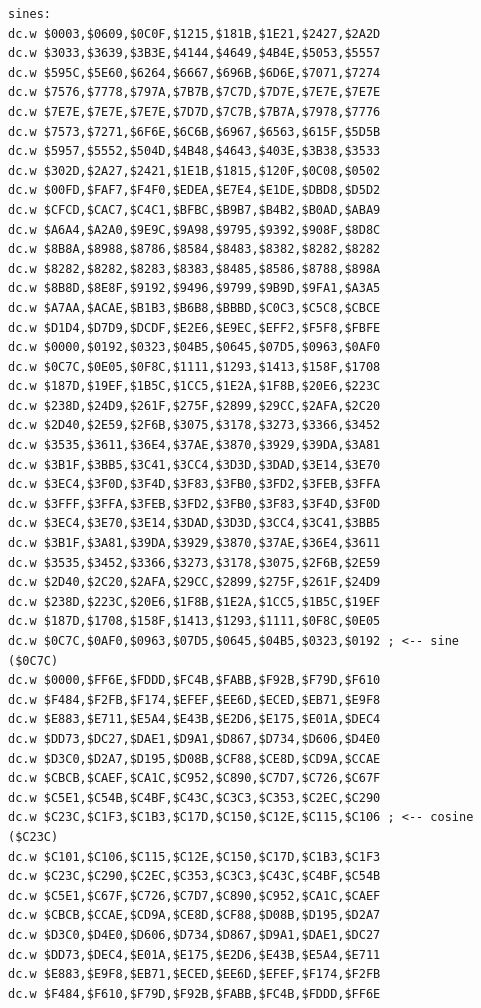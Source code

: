 \begin{lstlisting}
sines:
dc.w $0003,$0609,$0C0F,$1215,$181B,$1E21,$2427,$2A2D
dc.w $3033,$3639,$3B3E,$4144,$4649,$4B4E,$5053,$5557
dc.w $595C,$5E60,$6264,$6667,$696B,$6D6E,$7071,$7274
dc.w $7576,$7778,$797A,$7B7B,$7C7D,$7D7E,$7E7E,$7E7E
dc.w $7E7E,$7E7E,$7E7E,$7D7D,$7C7B,$7B7A,$7978,$7776
dc.w $7573,$7271,$6F6E,$6C6B,$6967,$6563,$615F,$5D5B
dc.w $5957,$5552,$504D,$4B48,$4643,$403E,$3B38,$3533
dc.w $302D,$2A27,$2421,$1E1B,$1815,$120F,$0C08,$0502
dc.w $00FD,$FAF7,$F4F0,$EDEA,$E7E4,$E1DE,$DBD8,$D5D2
dc.w $CFCD,$CAC7,$C4C1,$BFBC,$B9B7,$B4B2,$B0AD,$ABA9
dc.w $A6A4,$A2A0,$9E9C,$9A98,$9795,$9392,$908F,$8D8C
dc.w $8B8A,$8988,$8786,$8584,$8483,$8382,$8282,$8282
dc.w $8282,$8282,$8283,$8383,$8485,$8586,$8788,$898A
dc.w $8B8D,$8E8F,$9192,$9496,$9799,$9B9D,$9FA1,$A3A5
dc.w $A7AA,$ACAE,$B1B3,$B6B8,$BBBD,$C0C3,$C5C8,$CBCE
dc.w $D1D4,$D7D9,$DCDF,$E2E6,$E9EC,$EFF2,$F5F8,$FBFE
dc.w $0000,$0192,$0323,$04B5,$0645,$07D5,$0963,$0AF0 
dc.w $0C7C,$0E05,$0F8C,$1111,$1293,$1413,$158F,$1708
dc.w $187D,$19EF,$1B5C,$1CC5,$1E2A,$1F8B,$20E6,$223C
dc.w $238D,$24D9,$261F,$275F,$2899,$29CC,$2AFA,$2C20
dc.w $2D40,$2E59,$2F6B,$3075,$3178,$3273,$3366,$3452
dc.w $3535,$3611,$36E4,$37AE,$3870,$3929,$39DA,$3A81
dc.w $3B1F,$3BB5,$3C41,$3CC4,$3D3D,$3DAD,$3E14,$3E70
dc.w $3EC4,$3F0D,$3F4D,$3F83,$3FB0,$3FD2,$3FEB,$3FFA
dc.w $3FFF,$3FFA,$3FEB,$3FD2,$3FB0,$3F83,$3F4D,$3F0D 
dc.w $3EC4,$3E70,$3E14,$3DAD,$3D3D,$3CC4,$3C41,$3BB5
dc.w $3B1F,$3A81,$39DA,$3929,$3870,$37AE,$36E4,$3611
dc.w $3535,$3452,$3366,$3273,$3178,$3075,$2F6B,$2E59
dc.w $2D40,$2C20,$2AFA,$29CC,$2899,$275F,$261F,$24D9
dc.w $238D,$223C,$20E6,$1F8B,$1E2A,$1CC5,$1B5C,$19EF
dc.w $187D,$1708,$158F,$1413,$1293,$1111,$0F8C,$0E05
dc.w $0C7C,$0AF0,$0963,$07D5,$0645,$04B5,$0323,$0192 ; <-- sine ($0C7C)
dc.w $0000,$FF6E,$FDDD,$FC4B,$FABB,$F92B,$F79D,$F610 
dc.w $F484,$F2FB,$F174,$EFEF,$EE6D,$ECED,$EB71,$E9F8
dc.w $E883,$E711,$E5A4,$E43B,$E2D6,$E175,$E01A,$DEC4
dc.w $DD73,$DC27,$DAE1,$D9A1,$D867,$D734,$D606,$D4E0
dc.w $D3C0,$D2A7,$D195,$D08B,$CF88,$CE8D,$CD9A,$CCAE
dc.w $CBCB,$CAEF,$CA1C,$C952,$C890,$C7D7,$C726,$C67F
dc.w $C5E1,$C54B,$C4BF,$C43C,$C3C3,$C353,$C2EC,$C290
dc.w $C23C,$C1F3,$C1B3,$C17D,$C150,$C12E,$C115,$C106 ; <-- cosine ($C23C)
dc.w $C101,$C106,$C115,$C12E,$C150,$C17D,$C1B3,$C1F3
dc.w $C23C,$C290,$C2EC,$C353,$C3C3,$C43C,$C4BF,$C54B
dc.w $C5E1,$C67F,$C726,$C7D7,$C890,$C952,$CA1C,$CAEF
dc.w $CBCB,$CCAE,$CD9A,$CE8D,$CF88,$D08B,$D195,$D2A7
dc.w $D3C0,$D4E0,$D606,$D734,$D867,$D9A1,$DAE1,$DC27
dc.w $DD73,$DEC4,$E01A,$E175,$E2D6,$E43B,$E5A4,$E711
dc.w $E883,$E9F8,$EB71,$ECED,$EE6D,$EFEF,$F174,$F2FB
dc.w $F484,$F610,$F79D,$F92B,$FABB,$FC4B,$FDDD,$FF6E 
\end{lstlisting}

